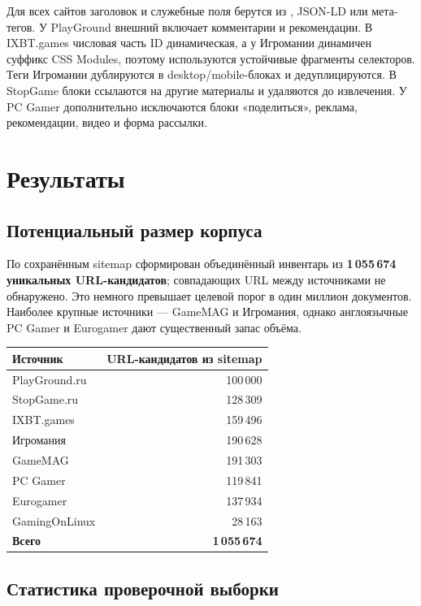 \documentclass[12pt,a4paper]{article}
\newcommand{\code}[1]{\texttt{\detokenize{#1}}}
\begin{document}
\normalsize
Для всех сайтов заголовок и служебные поля берутся из \code{h1}, JSON-LD или
мета-тегов. У PlayGround внешний \code{article} включает комментарии и
рекомендации. В IXBT.games числовая часть ID динамическая, а у Игромании
динамичен суффикс CSS Modules, поэтому используются устойчивые фрагменты
селекторов. Теги Игромании дублируются в desktop/mobile-блоках и
дедуплицируются. В StopGame блоки \code{_read-more} ссылаются на другие
материалы и удаляются до извлечения. У PC Gamer дополнительно исключаются
блоки «поделиться», реклама, рекомендации, видео и форма рассылки.

\section{Результаты}

\subsection{Потенциальный размер корпуса}

По сохранённым sitemap сформирован объединённый инвентарь из
\textbf{1\,055\,674 уникальных URL-кандидатов}; совпадающих URL между
источниками не обнаружено. Это немного превышает целевой порог в один миллион
документов. Наиболее крупные источники --- GameMAG и Игромания, однако
англоязычные PC Gamer и Eurogamer дают существенный запас объёма.

\begin{center}
\small
\renewcommand{\arraystretch}{1.12}
\begin{tabular}{lr}
\toprule
Источник & URL-кандидатов из sitemap \\
\midrule
PlayGround.ru & 100\,000 \\
StopGame.ru & 128\,309 \\
IXBT.games & 159\,496 \\
Игромания & 190\,628 \\
GameMAG & 191\,303 \\
PC Gamer & 119\,841 \\
Eurogamer & 137\,934 \\
GamingOnLinux & 28\,163 \\
\midrule
\textbf{Всего} & \textbf{1\,055\,674} \\
\bottomrule
\end{tabular}
\end{center}
\normalsize

\subsection{Статистика проверочной выборки}
\end{document}
